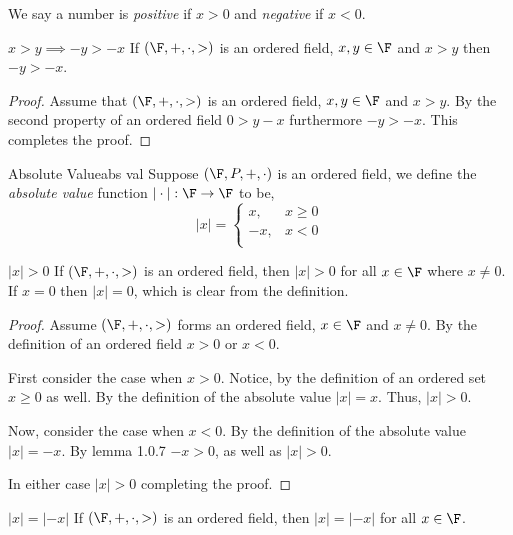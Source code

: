 \documentclass{report}
\begin{document}
\begin{notation}{}{}
  We say a number is \emph{positive} if $x > 0$ and \emph{negative} if $x < 0$.
\end{notation}

\begin{lemma}{$x > y \implies -y > -x$}{}
  If $\left(\F, +, \cdot, >\right)$ is an ordered field, $x, y \in \F$ and $x > y$ then $-y > -x$.
\end{lemma}

\begin{proof}
  Assume that $\left(\F, +, \cdot, >\right)$ is an ordered field, $x, y \in \F$ and $x > y$.
  By the second property of an ordered field $0 > y - x$ furthermore $-y > -x$.
  This completes the proof.
\end{proof}


\begin{definition}{Absolute Value}{abs val}
  Suppose $\left(\F, P, +, \cdot\right)$ is an ordered field, we define the \emph{absolute value} function $|\cdot|: \F \rightarrow \F$ to be,
  $$|x| = \begin{cases}
      x,  & x \geq 0 \\
      -x, & x < 0    \\
    \end{cases}$$
\end{definition}


\begin{proposition}{$|x| > 0$}{}
  If $\left(\F, +, \cdot, >\right)$ is an ordered field,
  then $|x| > 0$ for all $x \in \F$ where $x \neq 0$.
  If $x = 0$ then $|x| = 0$, which is clear from the definition.
\end{proposition}

\begin{proof}
  Assume $\left(\F, +, \cdot, >\right)$ forms an ordered field, $x \in \F$ and $x \neq 0$.
  By the definition of an ordered field $x > 0$ or $x < 0$.

  First consider the case when $x > 0$.
  Notice, by the definition of an ordered set $x \geq 0$ as well.
  By the definition of the absolute value $|x| = x$.
  Thus, $|x| > 0$.

  Now, consider the case when $x < 0$.
  By the definition of the absolute value $|x| = -x$.
  By lemma 1.0.7 $-x > 0$, as well as $|x| > 0$.

  In either case $|x| > 0$ completing the proof.
\end{proof}

\begin{proposition}{$|x| = |-x|$}{}
  If $\left(\F, +, \cdot, >\right)$ is an ordered field,
  then $|x| = |-x|$ for all $x \in \F$.
\end{proposition}
\end{document}
